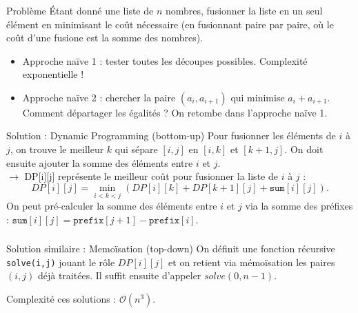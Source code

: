 \begin{frame}
    \frametitle{\problemtitle}
    \begin{block}{Problème}
        Étant donné une liste de $n$ nombres, fusionner la liste en un seul élément en minimisant le coût nécessaire (en fusionnant paire par paire, où le coût d'une fusione est la somme des nombres).
    \end{block}
    \pause
    \begin{itemize}
        \item Approche naïve 1 : tester toutes les découpes possibles. Complexité exponentielle ! \pause
        \item Approche naïve 2 : chercher la paire $(a_i,a_{i+1})$ qui minimise $a_i+a_{i+1}$. Comment départager les égalités ? On retombe dans l'approche naïve 1.
    \end{itemize}
    \pause
    \begin{block}{Solution : Dynamic Programming (bottom-up)}
        Pour fusionner les éléments de $i$ à $j$, on trouve le meilleur $k$ qui sépare $[i,j]$ en $[i,k]$ et $[k+1,j]$. On doit ensuite ajouter la somme des éléments entre $i$ et $j$. \\ \pause
        $\rightarrow$ DP[i][j] représente le meilleur coût pour fusionner la liste de $i$ à $j$ :
        \[
        DP[i][j] = \min_{i<k<j}(DP[i][k] + DP[k+1][j] + \texttt{sum}[i][j]).
        \]
        \pause
        On peut pré-calculer la somme des éléments entre $i$ et $j$ via la somme des préfixes : $\texttt{sum}[i][j] = \texttt{prefix}[j+1] - \texttt{prefix}[i]$.
    \end{block}
\end{frame}

\begin{frame}
    \frametitle{\problemtitle}
    \begin{block}{Solution similaire : Memo\"isation (top-down)}
       On définit une fonction récursive \texttt{solve(i,j)} jouant le rôle $DP[i][j]$ et on retient via mémoïsation les paires $(i,j)$ déjà traitées. Il suffit ensuite d'appeler $solve(0,n-1)$.
    \end{block}
    \pause
    Complexité ces solutions : $\mathcal{O}(n^3)$.

\end{frame}